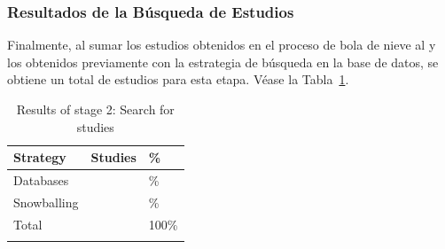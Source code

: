 \subsubsection{Resultados de la Búsqueda de Estudios}\label{subsubsec:resultados-busqueda}

\newcommand{\totalEtapaDos}{\fpeval{\screenTot+\snowballNewStudies}}
\newcommand{\dbPercentEtapa}{\fpeval{round (\screenTot*100/\totalEtapaDos,2)}}
\newcommand{\snowPercentEtapa}{\fpeval{round (\snowballNewStudies*100/\totalEtapaDos,2)}}

Finalmente, al sumar los estudios \snowballNewStudies{} obtenidos en el proceso de bola de nieve al \screenTot{} y los
obtenidos previamente con la estrategia de búsqueda en la base de datos, se obtiene un total de \totalEtapaDos{} 
estudios para esta etapa. Véase la Tabla~\ref{table:resultados_etapa_2}.

\begin{table}[htbp]
	\centering
	\renewcommand{\arraystretch}{1}  %
	\begin{tabular}{p{2.5cm}p{2.6cm}p{2.5cm}}
		\toprule
		\textbf{Strategy} & \textbf{Studies}      & \textbf{\%}           \\
		\midrule
		Databases         & \screenTot{}          & \dbPercentEtapa{}\%   \\
		\addlinespace[0.8em]
		Snowballing       & \snowballNewStudies{} & \snowPercentEtapa{}\% \\
		\addlinespace[0.8em]
		Total             & \totalEtapaDos{}      &  100\%                 \\
		\bottomrule
		\vspace{2pt}
	\end{tabular}
	\caption{Results of stage 2: Search for studies}\label{table:resultados_etapa_2}
\end{table}
